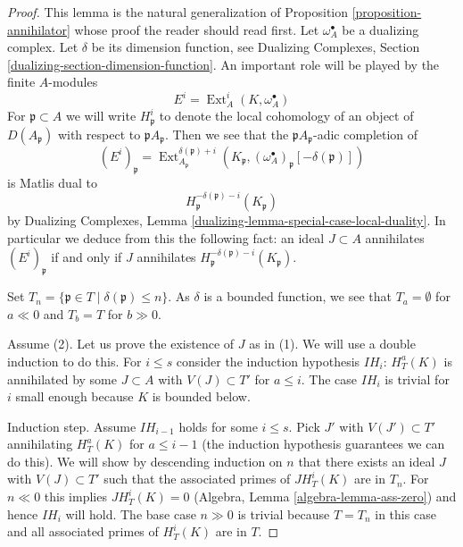 \documentclass{stacks-project}
\theoremstyle{plain}
\theoremstyle{definition}
\theoremstyle{remark}
\numberwithin{equation}{subsection}
\def\Ext{\mathop{\mathrm{Ext}}\nolimits}
\begin{document}
\begin{proof}
This lemma is the natural generalization of
Proposition \ref{proposition-annihilator}
whose proof the reader should read first.
Let $\omega_A^\bullet$ be a dualizing complex. Let $\delta$ be its
dimension function, see Dualizing Complexes, Section
\ref{dualizing-section-dimension-function}.
An important role will be played by the finite $A$-modules
$$
E^i = \Ext_A^i(K, \omega_A^\bullet)
$$
For $\mathfrak p \subset A$ we will write $H^i_\mathfrak p$ to denote the
local cohomology of an object of $D(A_\mathfrak p)$ with respect to
$\mathfrak pA_\mathfrak p$. Then we see that
the $\mathfrak pA_\mathfrak p$-adic completion of
$$
(E^i)_\mathfrak p =
\Ext^{\delta(\mathfrak p) + i}_{A_\mathfrak p}(K_\mathfrak p,
(\omega_A^\bullet)_\mathfrak p[-\delta(\mathfrak p)])
$$
is Matlis dual to
$$
H^{-\delta(\mathfrak p) - i}_{\mathfrak p}(K_\mathfrak p)
$$
by
Dualizing Complexes, Lemma \ref{dualizing-lemma-special-case-local-duality}.
In particular we deduce from this the
following fact: an ideal $J \subset A$ annihilates
$(E^i)_\mathfrak p$ if and only if $J$ annihilates
$H^{-\delta(\mathfrak p) - i}_{\mathfrak p}(K_\mathfrak p)$.

\medskip\noindent
Set $T_n = \{\mathfrak p \in T \mid \delta(\mathfrak p) \leq n\}$.
As $\delta$ is a bounded function, we see that
$T_a = \emptyset$ for $a \ll 0$ and $T_b = T$ for $b \gg 0$.

\medskip\noindent
Assume (2). Let us prove the existence of $J$ as in (1).
We will use a double induction to do this. For $i \leq s$
consider the induction hypothesis $IH_i$:
$H^a_T(K)$ is annihilated by some $J \subset A$ with $V(J) \subset T'$
for $a \leq i$. The case $IH_i$ is trivial for $i$ small
enough because $K$ is bounded below.

\medskip\noindent
Induction step. Assume $IH_{i - 1}$ holds for some $i \leq s$.
Pick $J'$ with $V(J') \subset T'$ annihilating $H^a_T(K)$ for
$a \leq i - 1$ (the induction hypothesis guarantees we can
do this). We will show by descending induction on $n$
that there exists an ideal $J$ with $V(J) \subset T'$ such that the
associated primes of $J H^i_T(K)$ are in $T_n$.
For $n \ll 0$ this implies $JH^i_T(K) = 0$ 
(Algebra, Lemma \ref{algebra-lemma-ass-zero})
and hence $IH_i$ will hold.
The base case $n \gg 0$ is trivial because $T = T_n$ in this case
and all associated primes of $H^i_T(K)$ are in $T$.


\end{proof}
\end{document}
